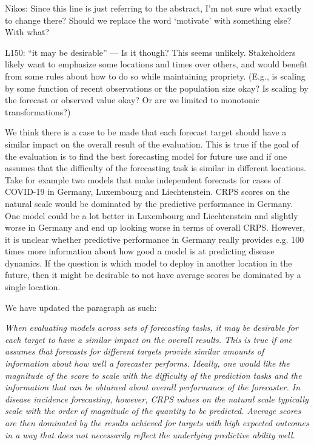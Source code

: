 \documentclass{article}
\newcommand{\red}{\color{red}}
\newcommand{\black}{\color{black}}
\begin{document}
Nikos: Since this line is just referring to the abstract, I'm not sure what exactly to change there? Should we replace the word `motivate' with something else? With what? 

\red
L150: “it may be desirable” — Is it though? This seems unlikely. Stakeholders likely want to emphasize some locations and times over others, and would benefit from some rules about how to do so while maintaining propriety. (E.g., is scaling by some function of recent observations or the population size okay? Is scaling by the forecast or observed value okay? Or are we limited to monotonic transformations?)

\black
We think there is a case to be made that each forecast target should have a similar impact on the overall result of the evaluation. This is true if the goal of the evaluation is to find the best forecasting model for future use and if one assumes that the difficulty of the forecasting task is similar in different locations. Take for example two models that make independent forecasts for cases of COVID-19 in Germany, Luxembourg and Liechtenstein. CRPS scores on the natural scale would be dominated by the predictive performance in Germany. One model could be a lot better in Luxembourg and Liechtenstein and slightly worse in Germany and end up looking worse in terms of overall CRPS. However, it is unclear whether predictive performance in Germany really provides e.g. 100 times more information about how good a model is at predicting disease dynamics. If the question is which model to deploy in another location in the future, then it might be desirable to not have average scores be dominated by a single location. 

We have updated the paragraph as such: 

\textit{When evaluating models across sets of forecasting tasks, it may be desirable for each target to have a similar impact on the overall results. This is true if one assumes that forecasts for different targets provide similar amounts of information about how well a forecaster performs. Ideally, one would like the magnitude of the score to scale with the difficulty of the prediction tasks and the information that can be obtained about overall performance of the forecaster. In disease incidence forecasting, however, CRPS values on the natural scale typically scale with the order of magnitude of the quantity to be predicted. Average scores are then dominated by the results achieved for targets with high expected outcomes in a way that does not necessarily reflect the underlying predictive ability well.}
\end{document}
